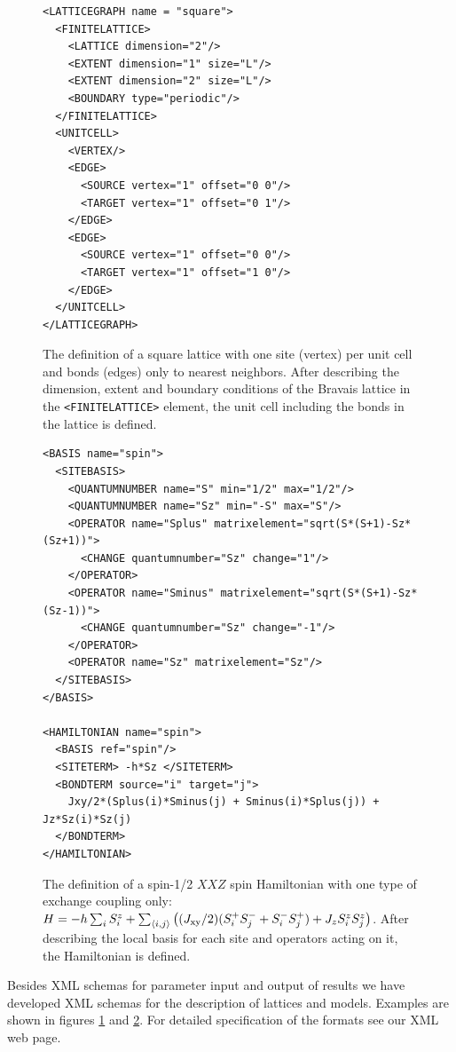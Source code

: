 \documentclass[12pt]{iopart}
\begin{document}
\begin{figure}
\begin{lstlisting}
<LATTICEGRAPH name = "square">
  <FINITELATTICE>
    <LATTICE dimension="2"/>  
    <EXTENT dimension="1" size="L"/>
    <EXTENT dimension="2" size="L"/>
    <BOUNDARY type="periodic"/>  
  </FINITELATTICE>
  <UNITCELL>
    <VERTEX/>
    <EDGE>
      <SOURCE vertex="1" offset="0 0"/>
      <TARGET vertex="1" offset="0 1"/>
    </EDGE>
    <EDGE>
      <SOURCE vertex="1" offset="0 0"/>
      <TARGET vertex="1" offset="1 0"/>
    </EDGE>
  </UNITCELL> 
</LATTICEGRAPH>
\end{lstlisting}
\caption{The definition of a square lattice with one site (vertex) per unit cell and bonds (edges) only to nearest neighbors. After describing the dimension, extent and boundary conditions of the Bravais lattice in the {\tt <FINITELATTICE>} element, the unit cell including the bonds in the lattice is defined.}
\label{fig:lattice}
\end{figure}
\begin{figure}
\begin{lstlisting}
<BASIS name="spin">
  <SITEBASIS>
    <QUANTUMNUMBER name="S" min="1/2" max="1/2"/>
    <QUANTUMNUMBER name="Sz" min="-S" max="S"/>
    <OPERATOR name="Splus" matrixelement="sqrt(S*(S+1)-Sz*(Sz+1))">   
      <CHANGE quantumnumber="Sz" change="1"/>
    </OPERATOR>
    <OPERATOR name="Sminus" matrixelement="sqrt(S*(S+1)-Sz*(Sz-1))">  
      <CHANGE quantumnumber="Sz" change="-1"/>
    </OPERATOR>
    <OPERATOR name="Sz" matrixelement="Sz"/>  
  </SITEBASIS>
</BASIS>

<HAMILTONIAN name="spin">
  <BASIS ref="spin"/>
  <SITETERM> -h*Sz </SITETERM>   
  <BONDTERM source="i" target="j">
    Jxy/2*(Splus(i)*Sminus(j) + Sminus(i)*Splus(j)) + Jz*Sz(i)*Sz(j)
  </BONDTERM>
</HAMILTONIAN>
\end{lstlisting}
\caption{The definition of a spin-1/2 $XXZ$ spin Hamiltonian with one type of exchange coupling only: $H=-h\sum_iS_i^z+\sum_{\langle i,j\rangle} \left((J_{\rm xy}/2)(S_i^+S_j^-+S_i^-S_j^+)+J_zS_i^zS_j^z\right)$.  After describing the local basis for each site and operators acting on it, the Hamiltonian is defined.}
\label{fig:model}
\end{figure}

Besides XML schemas for parameter input and output of results we have developed XML schemas for the description of lattices and models. Examples are shown in figures \ref{fig:lattice} and \ref{fig:model}. For detailed specification of the formats see our XML web page.\cite{xmlschema} 
\end{document}
